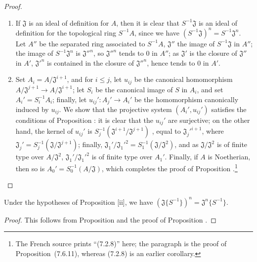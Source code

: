 \begin{proof}
\medskip\noindent
\begin{enumerate}
  \item[(i)] If $\mathfrak{J}$ is an ideal of definition for $A$, then it is clear that
    $S^{-1}\mathfrak{J}$ is an ideal of definition for the topological ring $S^{-1}A$, since we
    have $(S^{-1}\mathfrak{J})^n=S^{-1}\mathfrak{J}^n$. Let $A''$ be the separated ring associated
    to $S^{-1}A$, $\mathfrak{J}''$ the image of $S^{-1}\mathfrak{J}$ in $A''$; the image of
    $S^{-1}\mathfrak{J}^n$ is ${\mathfrak{J}''}^n$, so ${\mathfrak{J}''}^n$ tends to $0$ in $A''$;
    as $\mathfrak{J}'$ is the closure of $\mathfrak{J}''$ in $A'$, ${\mathfrak{J}'}^n$ is contained
    in the closure of ${\mathfrak{J}''}^n$, hence tends to $0$ in $A'$.
  \item[(ii)] Set $A_i=A/\mathfrak{J}^{i+1}$, and for $i\leq j$, let $u_{ij}$ be the canonical
    homomorphism $A/\mathfrak{J}^{j+1}\to A/\mathfrak{J}^{i+1}$; let $S_i$ be the canonical image of
    $S$ in $A_i$, and set $A_i'=S_i^{-1}A_i$; finally, let $u_{ij}':A_j'\to A_i'$ be the homomorphism
    canonically induced by $u_{ij}$. We show that the projective system $(A_i',u_{ij}')$ satisfies
    the conditions of Proposition : it is clear that the $u_{ij}'$
    are surjective; on the other hand, the kernel of $u_{ij}'$ is
    $S_j^{-1}(\mathfrak{J}^{i+1}/\mathfrak{J}^{j+1})$ , equal to
    ${\mathfrak{J}_j'}^{i+1}$, where $\mathfrak{J}_j'=S_j^{-1}(\mathfrak{J}/\mathfrak{J}^{j+1})$;
    finally, $\mathfrak{J}_1'/{\mathfrak{J}_1'}^2=S_1^{-1}(\mathfrak{J}/\mathfrak{J}^2)$, and as
    $\mathfrak{J}/\mathfrak{J}^2$ is of finite type over $A/\mathfrak{J}^2$,
    $\mathfrak{J}_1'/{\mathfrak{J}_1'}^2$ is of finite type over $A_1'$. Finally, if $A$ is
    Noetherian, then so is $A_0'=S_0^{-1}(A/\mathfrak{J})$, which completes the proof of
    Proposition .\footnote{The French source prints ``(7.2.8)'' here; the paragraph is
    the proof of Proposition~(7.6.11), whereas (7.2.8) is an earlier corollary.}
\end{enumerate}
\end{proof}

\begin{corollary}[7.6.12]
\label{0.7.6.12}
Under the hypotheses of Proposition [ii], we have
$(\mathfrak{J}\{S^{-1}\})^n=\mathfrak{J}^n\{S^{-1}\}$.
\end{corollary}

\begin{proof}
This follows from Proposition  and the proof of
Proposition .
\end{proof}

